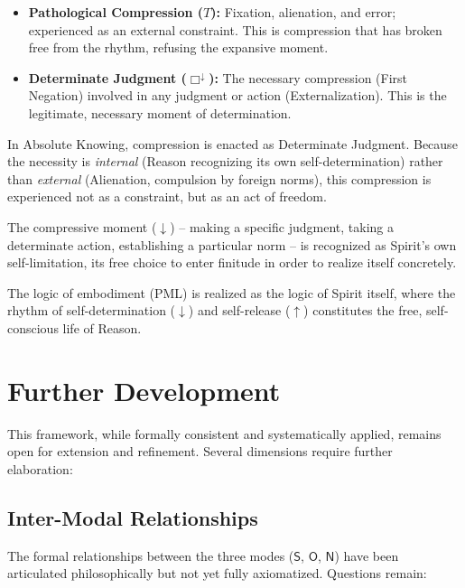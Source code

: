 \documentclass[12pt]{book}
\begin{document}
\begin{itemize}
\item \textbf{Pathological Compression ($T$):} Fixation, alienation, and error; experienced as an external constraint. This is compression that has broken free from the rhythm, refusing the expansive moment.

\item \textbf{Determinate Judgment ($\Box^{\downarrow}$):} The necessary compression (First Negation) involved in any judgment or action (Externalization). This is the legitimate, necessary moment of determination.
\end{itemize}

In Absolute Knowing, compression is enacted as Determinate Judgment. Because the necessity is \textit{internal} (Reason recognizing its own self-determination) rather than \textit{external} (Alienation, compulsion by foreign norms), this compression is experienced not as a constraint, but as an act of freedom.

The compressive moment ($\downarrow$) -- making a specific judgment, taking a determinate action, establishing a particular norm -- is recognized as Spirit's own self-limitation, its free choice to enter finitude in order to realize itself concretely.

The logic of embodiment (PML) is realized as the logic of Spirit itself, where the rhythm of self-determination ($\downarrow$) and self-release ($\uparrow$) constitutes the free, self-conscious life of Reason.

\section{Further Development}

This framework, while formally consistent and systematically applied, remains open for extension and refinement. Several dimensions require further elaboration:

\subsection{Inter-Modal Relationships}

The formal relationships between the three modes ($\mathsf{S}$, $\mathsf{O}$, $\mathsf{N}$) have been articulated philosophically but not yet fully axiomatized. Questions remain:
\end{document}
